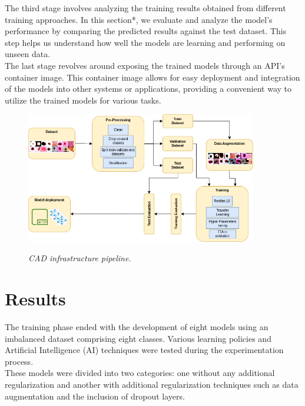 The third stage involves analyzing the training results obtained from different
training approaches. In this section*, we evaluate and analyze the model's
performance by comparing the predicted results against the test dataset. This
step helps us understand how well the models are learning and performing on
unseen data. \\

The last stage revolves around exposing the trained models through an API's
container image. This container image allows for easy deployment and
integration of the models into other systems or applications, providing a
convenient way to utilize the trained models for various tasks. \\


\begin{figure}[H]
  \centering
  \includegraphics[width=0.9\textwidth]{imatges/methodological_contribution/Pipeline.drawio.png}
  \caption[CAD infrastructure pipeline]{\textit{CAD infrastructure pipeline. }}
  {\label{fig:cad-infrastructure-training-system}}
\end{figure}

\section{Results}

The training phase ended with the development of eight models using an
imbalanced dataset comprising eight classes. Various learning policies and
Artificial Intelligence (AI) techniques were tested during the experimentation
process.  \\

These models were divided into two categories: one without any
additional regularization and another with additional regularization techniques
such as data augmentation and the inclusion of dropout layers.

